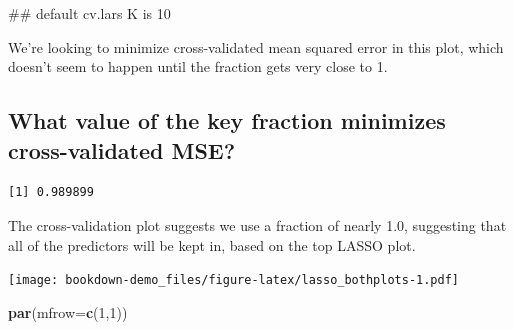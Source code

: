 \documentclass[]{book}
\newenvironment{Shaded}{\begin{snugshade}}{\end{snugshade}}
\newcommand{\KeywordTok}[1]{\textcolor[rgb]{0.13,0.29,0.53}{\textbf{#1}}}
\newcommand{\DataTypeTok}[1]{\textcolor[rgb]{0.13,0.29,0.53}{#1}}
\newcommand{\DecValTok}[1]{\textcolor[rgb]{0.00,0.00,0.81}{#1}}
\newcommand{\StringTok}[1]{\textcolor[rgb]{0.31,0.60,0.02}{#1}}
\newcommand{\OperatorTok}[1]{\textcolor[rgb]{0.81,0.36,0.00}{\textbf{#1}}}
\newcommand{\NormalTok}[1]{#1}
\theoremstyle{definition}
\theoremstyle{definition}
\theoremstyle{definition}
\theoremstyle{remark}
\begin{document}
\begin{Shaded}
\begin{Highlighting}[]
\NormalTok{## default cv.lars K is 10}
\end{Highlighting}
\end{Shaded}

We're looking to minimize cross-validated mean squared error in this
plot, which doesn't seem to happen until the fraction gets very close to
1.

\subsection{What value of the key fraction minimizes cross-validated
MSE?}\label{what-value-of-the-key-fraction-minimizes-cross-validated-mse}

\begin{Shaded}
\end{Shaded}

\begin{verbatim}
[1] 0.989899
\end{verbatim}

The cross-validation plot suggests we use a fraction of nearly 1.0,
suggesting that all of the predictors will be kept in, based on the top
LASSO plot.

\begin{Shaded}
\end{Shaded}

\texttt{[image: bookdown-demo\_files/figure-latex/lasso\_bothplots-1.pdf]}

\begin{Shaded}
\begin{Highlighting}[]
\KeywordTok{par}\NormalTok{(}\DataTypeTok{mfrow=}\KeywordTok{c}\NormalTok{(}\DecValTok{1}\NormalTok{,}\DecValTok{1}\NormalTok{))}
\end{Highlighting}
\end{Shaded}
\end{document}
